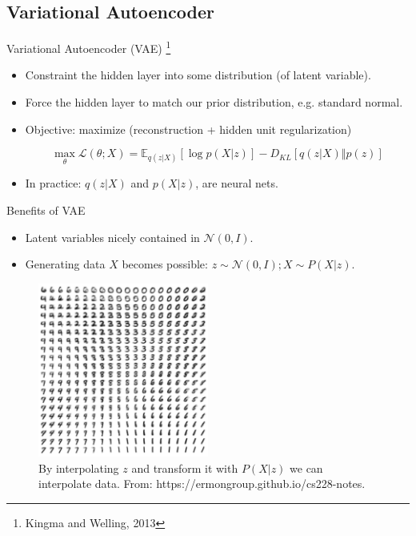 \documentclass{beamer}
\begin{document}
    \subsection{Variational Autoencoder}

    \begin{frame}{Variational Autoencoder (VAE) \footnote{Kingma and Welling, 2013}}

        \begin{itemize}
            \item Constraint the hidden layer into some distribution (of latent variable).
            \item Force the hidden layer to match our prior distribution, e.g. standard normal.
            \item Objective: maximize (reconstruction + hidden unit regularization)

            $$\max_{\theta} \mathcal{L}(\theta;X) = \mathbb{E}_{q(z \vert X)}[\log p(X \vert z)] - D_{KL}[q(z \vert X) \Vert p(z)]$$

            \item In practice: $q(z \vert X)$ and $p(X \vert z)$, are neural nets.
        \end{itemize}

    \end{frame}

    \begin{frame}{Benefits of VAE}
        \begin{itemize}
            \item Latent variables nicely contained in $\mathcal{N}(0, I)$.
            \item Generating data $X$ becomes possible: $z \sim \mathcal{N}(0, I); X \sim P(X \vert z)$.
        \end{itemize}

        \begin{figure}
            \includegraphics[width=0.5\textwidth]{vaeinterpolation}
            \caption{\label{fig:interpolation} By interpolating $z$ and transform it with $P(X \vert z)$ we can interpolate data. From: https://ermongroup.github.io/cs228-notes.}
        \end{figure}
    \end{frame}
\end{document}
